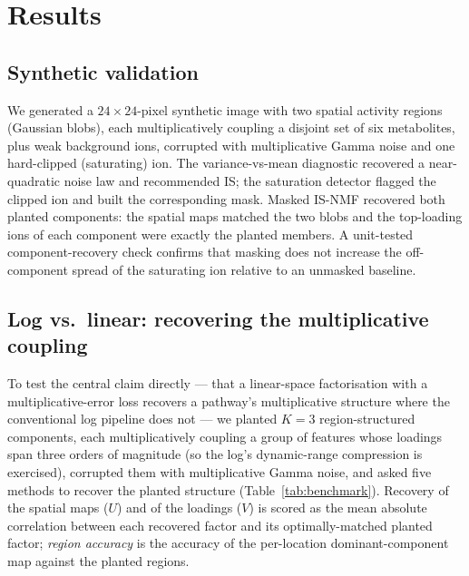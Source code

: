 \documentclass[11pt]{article}
\begin{document}
\section{Results}
\label{sec:results}

\subsection{Synthetic validation}
\label{sec:synthetic}

We generated a $24 \times 24$-pixel synthetic image with two spatial activity regions
(Gaussian blobs), each multiplicatively coupling a disjoint set of six metabolites, plus
weak background ions, corrupted with multiplicative Gamma noise and one hard-clipped
(saturating) ion. The variance-vs-mean diagnostic recovered a near-quadratic noise law and
recommended IS; the saturation detector flagged the clipped ion and built the corresponding
mask. Masked IS-NMF recovered both planted components: the spatial maps matched the two
blobs and the top-loading ions of each component were exactly the planted members. A
unit-tested component-recovery check confirms that masking does not increase the
off-component spread of the saturating ion relative to an unmasked baseline.

\subsection{Log vs.\ linear: recovering the multiplicative coupling}
\label{sec:benchmark}

To test the central claim directly --- that a linear-space factorisation with a
multiplicative-error loss recovers a pathway's multiplicative structure where the
conventional log pipeline does not --- we planted $K = 3$ region-structured components, each
multiplicatively coupling a group of features whose loadings span three orders of magnitude
(so the log's dynamic-range compression is exercised), corrupted them with multiplicative
Gamma noise, and asked five methods to recover the planted structure
(Table~\ref{tab:benchmark}). Recovery of the spatial maps ($U$) and of the loadings ($V$) is
scored as the mean absolute correlation between each recovered factor and its
optimally-matched planted factor; \emph{region accuracy} is the accuracy of the per-location
dominant-component map against the planted regions.
\end{document}
